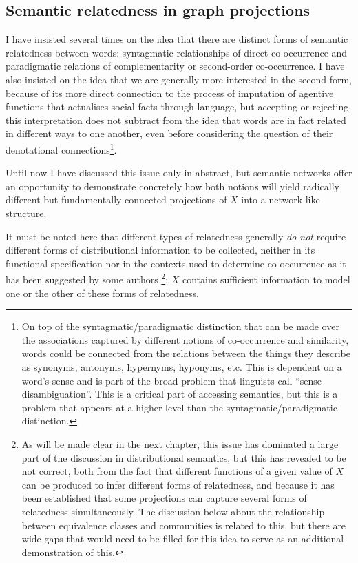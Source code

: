 \subsection{Semantic relatedness in graph projections}

I have insisted several times on the idea that there are distinct forms of semantic relatedness between words: syntagmatic relationships of direct co-occurrence and paradigmatic relations of complementarity or second-order co-occurrence.
I have also insisted on the idea that we are generally more interested in the second form, because of its more direct connection to the process of imputation of agentive functions that actualises social facts through language, but accepting or rejecting this interpretation does not subtract from the idea that words are in fact related in different ways to one another, even before considering the question of their denotational connections\footnote{
    On top of the syntagmatic/paradigmatic distinction that can be made over the associations captured by different notions of co-occurrence and similarity, words could be connected from the relations between the things they describe as synonyms, antonyms, hypernyms, hyponyms, etc.
    This is dependent on a word's sense and is part of the broad problem that linguists call ``sense disambiguation''.
    This is a critical part of accessing semantics, but this is a problem that appears at a higher level than the syntagmatic/paradigmatic distinction.
}.

Until now I have discussed this issue only in abstract, but semantic networks offer an opportunity to demonstrate concretely how both notions will yield radically different but fundamentally connected projections of $X$ into a network-like structure.

It must be noted here that different types of relatedness generally \emph{do not} require different forms of distributional information to be collected, neither in its functional specification nor in the contexts used to determine co-occurrence as it has been suggested by some authors \citep{sahlgren2006}\footnote{
    As will be made clear in the next chapter, this issue has dominated a large part of the discussion in distributional semantics, but this has revealed to be not correct, both from the fact that different functions of a given value of $X$ can be produced to infer different forms of relatedness, and because it has been established that some projections can capture several forms of relatedness simultaneously.
    The discussion below about the relationship between equivalence classes and communities is related to this, but there are wide gaps that would need to be filled for this idea to serve as an additional demonstration of this.
}:
$X$ contains sufficient information to model one or the other of these forms of relatedness.

